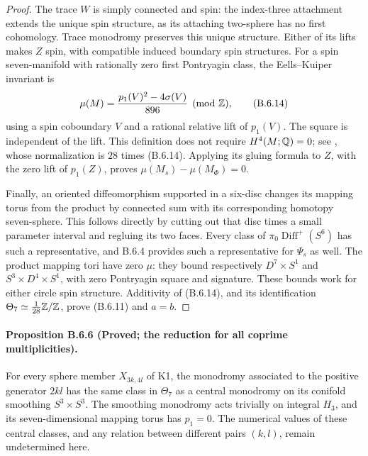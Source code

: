 \begin{proof}
The trace $W$ is simply connected and spin: the index-three
attachment extends the unique spin structure, as its attaching
two-sphere has no first cohomology. Trace monodromy preserves
this unique structure. Either of its lifts makes $Z$ spin,
with compatible induced boundary spin structures. For a spin
seven-manifold with rationally zero first Pontryagin class,
the Eells--Kuiper invariant is
\[
 \mu(M)=\frac{p_1(V)^2-4\sigma(V)}{896}\pmod{\mathbb Z},
 \tag{B.6.14}
\]
using a spin coboundary $V$ and a rational relative lift of
$p_1(V)$. The square is independent of the lift. This definition
does not require $H^4(M;\mathbb Q)=0$; see
\cite[Section 1.4, equations (2)--(3)]{mapsCrowleyNordstrom19},
whose normalization is $28$ times (B.6.14). Applying its gluing
formula to $Z$, with the zero lift of $p_1(Z)$, proves
$\mu(M_s)-\mu(M_\Phi)=0$.

Finally, an oriented diffeomorphism supported in a six-disc
changes its mapping torus from the product by connected sum
with its corresponding homotopy seven-sphere. This follows
directly by cutting out that disc times a small parameter
interval and regluing its two faces. Every class of
$\pi_0\operatorname{Diff}^+(S^6)$ has such a representative,
and B.6.4 provides such a representative for $\Psi_s$ as well.
The product mapping tori have zero $\mu$: they bound respectively
$D^7\times S^1$ and $S^3\times D^4\times S^1$, with zero
Pontryagin square and signature. These bounds work for either
circle spin structure. Additivity of (B.6.14), and its
identification $\Theta_7\simeq\frac1{28}\mathbb Z/\mathbb Z$, prove
(B.6.11) and $a=b$.
\end{proof}

\paragraph{Proposition B.6.6 (Proved; the reduction for all coprime multiplicities).}
For every sphere member $X_{3k,4l}$ of K1, the monodromy associated
to the positive generator $2kl$ has the same class in $\Theta_7$
as a central monodromy on its conifold smoothing $S^3\times S^3$.
The smoothing monodromy acts trivially on integral $H_3$, and
its seven-dimensional mapping torus has $p_1=0$. The numerical
values of these central classes, and any relation between
different pairs $(k,l)$, remain undetermined here.

